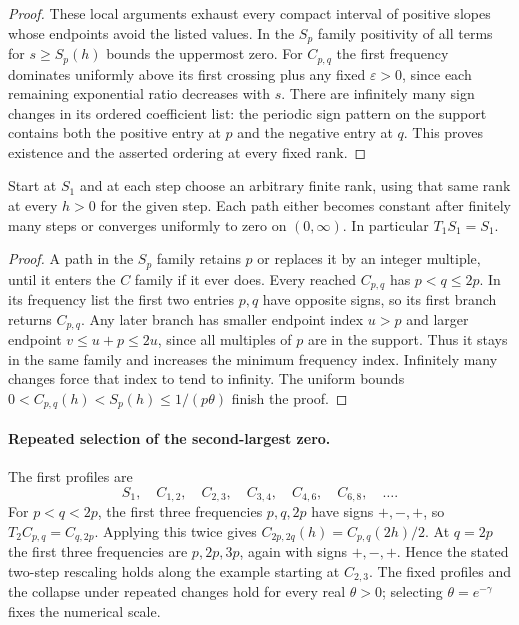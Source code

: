 \documentclass[11pt,a4paper]{article}
\theoremstyle{definition}\newtheorem{definition}[theorem]{Definition}\newtheorem{example}[theorem]{Example}
\theoremstyle{remark}\newtheorem{remark}[theorem]{Remark}
\begin{document}
\begin{proof}
These local arguments exhaust every compact interval of positive slopes whose endpoints avoid the listed values. In the $S_p$ family positivity of all terms for $s\ge S_p(h)$ bounds the uppermost zero. For $C_{p,q}$ the first frequency dominates uniformly above its first crossing plus any fixed $\varepsilon>0$, since each remaining exponential ratio decreases with $s$. There are infinitely many sign changes in its ordered coefficient list: the periodic sign pattern on the support contains both the positive entry at $p$ and the negative entry at $q$. This proves existence and the asserted ordering at every fixed rank.
\end{proof}

\begin{corollary}\label{cor:rev-branch-limit}
Start at $S_1$ and at each step choose an arbitrary finite rank, using that same rank at every $h>0$ for the given step. Each path either becomes constant after finitely many steps or converges uniformly to zero on $(0,\infty)$. In particular $T_1 S_1=S_1$.
\end{corollary}
\begin{proof}
A path in the $S_p$ family retains $p$ or replaces it by an integer multiple, until it enters the $C$ family if it ever does. Every reached $C_{p,q}$ has $p<q\le2p$. In its frequency list the first two entries $p,q$ have opposite signs, so its first branch returns $C_{p,q}$. Any later branch has smaller endpoint index $u>p$ and larger endpoint $v\le u+p\le2u$, since all multiples of $p$ are in the support. Thus it stays in the same family and increases the minimum frequency index. Infinitely many changes force that index to tend to infinity. The uniform bounds $0<C_{p,q}(h)<S_p(h)\le1/(p\theta)$ finish the proof.
\end{proof}

\paragraph{Repeated selection of the second-largest zero.}
The first profiles are
\[
 S_1,\quad C_{1,2},\quad C_{2,3},\quad C_{3,4},\quad
 C_{4,6},\quad C_{6,8},\quad\ldots .
\]
For $p<q<2p$, the first three frequencies $p,q,2p$ have signs $+,-,+$, so $T_2 C_{p,q}=C_{q,2p}$. Applying this twice gives $C_{2p,2q}(h)=C_{p,q}(2h)/2$. At $q=2p$ the first three frequencies are $p,2p,3p$, again with signs $+,-,+$. Hence the stated two-step rescaling holds along the example starting at $C_{2,3}$. The fixed profiles and the collapse under repeated changes hold for every real $\theta>0$; selecting $\theta=e^{-\gamma}$ fixes the numerical scale.
\end{document}
